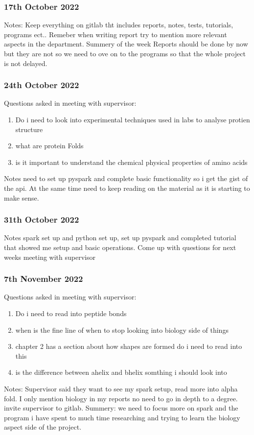 \documentclass{report}
\begin{document}
\subsubsection{17th October 2022}
Notes: Keep everything on gitlab tht includes reports, notes, tests, tutorials, programs ect..
Remeber when writing report try to mention more relevant aspects in the department.
Summery of the week Reports should be done by now but they are not so we need to ove on to the programs so that the whole project is not delayed.

\subsubsection{24th October 2022}
Questions asked in meeting with supervisor: 
\begin{enumerate}
    \item Do i need to look into experimental techniques used in labs to analyse protien structure
    \item what are protein Folds
    \item is it important to understand the chemical physical properties of amino acids
\end{enumerate}
Notes need to set up pyspark and complete basic functionality so i get the gist of the api. At the same time need to keep reading on the material as it is starting to make sense. 

\subsubsection{31th October 2022}
Notes spark set up and python set up, set up pyspark and completed tutorial that showed me setup and basic operations. Come up with questions for next weeks meeting with supervisor

\subsubsection{7th November 2022}
Questions asked in meeting with supervisor: 
\begin{enumerate}
    \item Do i need to read into peptide bonds
    \item when is the fine line of when to stop looking into biology side of things
    \item chapter 2 has a section about how shapes are formed do i need to read into this
    \item is the difference between ahelix and bhelix somthing i should look into
\end{enumerate}
Notes: Supervisor said they want to see my spark setup, read more into alpha fold. I only mention biology in my reports no need to go in depth to a degree. invite supervisor to gitlab.
Summery: we need to focus more on spark and the program i have spent to much time researching and trying to learn the biology aspect side of the project.
\end{document}

